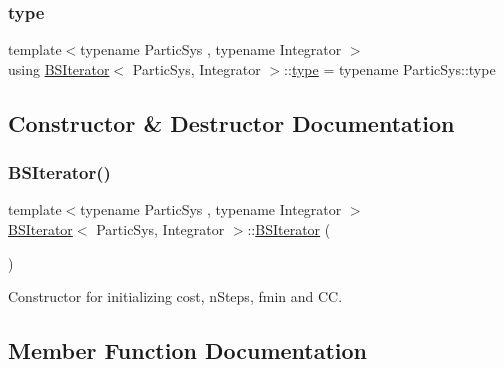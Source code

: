 \mbox{\label{class_b_s_iterator_a19530085797de211565a566f581f20ca}} 
\subsubsection{\texorpdfstring{type}{type}}
{\footnotesize\ttfamily template$<$typename Partic\+Sys , typename Integrator $>$ \\
using \mbox{\hyperlink{class_b_s_iterator}{B\+S\+Iterator}}$<$ Partic\+Sys, Integrator $>$\+::\mbox{\hyperlink{class_b_s_iterator_a19530085797de211565a566f581f20ca}{type}} =  typename Partic\+Sys\+::type}



\subsection{Constructor \& Destructor Documentation}
\mbox{\label{class_b_s_iterator_a144fb5c55fcd7bc873e73f4d06276fb2}} 
\subsubsection{\texorpdfstring{B\+S\+Iterator()}{BSIterator()}}
{\footnotesize\ttfamily template$<$typename Partic\+Sys , typename Integrator $>$ \\
\mbox{\hyperlink{class_b_s_iterator}{B\+S\+Iterator}}$<$ Partic\+Sys, Integrator $>$\+::\mbox{\hyperlink{class_b_s_iterator}{B\+S\+Iterator}} (\begin{DoxyParamCaption}{ }\end{DoxyParamCaption})}



Constructor for initializing cost, n\+Steps, fmin and CC. 



\subsection{Member Function Documentation}
\mbox{\label{class_b_s_iterator_a47c558caa06982900eac316e10b50d4d}} 
